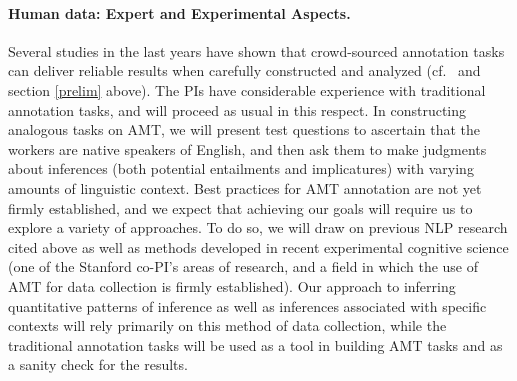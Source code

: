 \documentclass[10pt]{article}
\begin{document}


\vspace{-.15in}
\paragraph{Human data: Expert and Experimental Aspects.}
Several studies in the last years have shown that crowd-sourced annotation tasks can deliver reliable results when carefully constructed and analyzed (cf.\ \cite{snow:08,munroetal2010} and section \ref{prelim} above). 
The PIs have considerable experience with traditional annotation tasks, and will proceed as usual in this respect.
In constructing analogous tasks on AMT, we will present test questions to ascertain that the workers are native speakers of English, and then ask them to make judgments about inferences (both potential entailments and implicatures) with varying amounts of linguistic context.
Best practices for AMT annotation are not yet firmly established, and we expect that achieving our goals will require us to explore a variety of approaches.
To do so, we will draw on previous NLP research cited above as well as methods developed in recent experimental cognitive science (one of the Stanford co-PI's areas of research, and a field in which the use of AMT for data collection is firmly established).
Our approach to inferring quantitative patterns of inference as well as inferences associated with specific contexts will rely primarily on this method of data collection, while the traditional annotation tasks will be used as a tool in building AMT tasks and as a sanity check for the results. 
\end{document}
